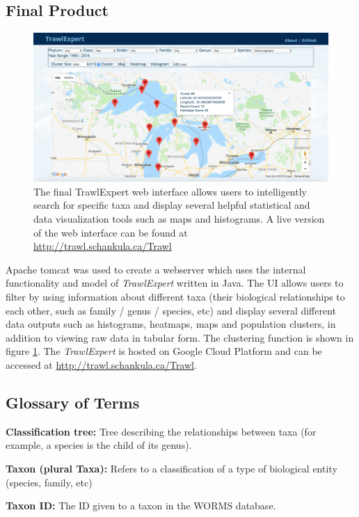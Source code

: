 \documentclass{article}
\begin{document}
\subsection{Final Product}
\begin{figure}
\centering
\includegraphics[width=16cm]{UI.png}
\caption{The final TrawlExpert web interface allows users to intelligently search for specific taxa and display several helpful statistical and data visualization tools such as maps and histograms. A live version of the web interface can be found at \url{http://trawl.schankula.ca/Trawl}}
\label{fig:UI}
\end{figure}

Apache tomcat was used to create a webserver which uses the internal functionality and model of \textit{TrawlExpert} written in Java. The UI allows users to filter by using information about different taxa (their biological relationships to each other, such as family / genus / species, etc) and display several different data outputs such as histograms, heatmaps, maps and population clusters, in addition to viewing raw data in tabular form. The clustering function is shown in figure \ref{fig:UI}. The \textit{TrawlExpert} is hosted on Google Cloud Platform and can be accessed at \url{http://trawl.schankula.ca/Trawl}. 

\subsection{Glossary of Terms}
\noindent\textbf{Classification tree:} Tree describing the relationships between taxa (for example, a species is the child of its genus).

\noindent\textbf{Taxon (plural Taxa):} Refers to a classification of a type of biological entity (species, family, etc)

\noindent\textbf{Taxon ID:} The ID given to a taxon in the WORMS database.
\end{document}
